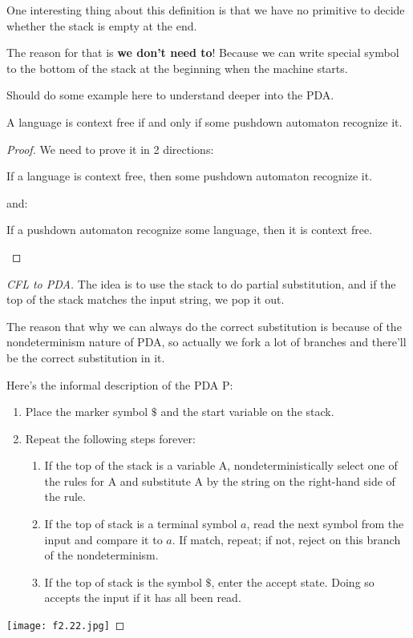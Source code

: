 One interesting thing about this definition is that we have no primitive to decide whether the stack is empty at the end.

The reason for that is \textbf{we don't need to}! Because we can write special symbol to the bottom of the stack at the beginning when the machine starts.

\begin{remark}
    Should do some example here to understand deeper into the PDA.   
\end{remark}

\begin{theorem}
    A language is context free if and only if some pushdown automaton recognize it.
\end{theorem}
\begin{proof}
    We need to prove it in 2 directions:
    \begin{lemma}\label{lemma: 4-1}
        If a language is context free, then some pushdown automaton recognize it.
    \end{lemma}
    and:
    \begin{lemma}\label{lemma: 4-2}
        If a pushdown automaton recognize some language, then it is context free.
    \end{lemma}
\end{proof}
\begin{proof}[CFL to PDA]
    The idea is to use the stack to do partial substitution, and if the top of the stack matches the input string, we pop it out.
    
    The reason that why we can always do the correct substitution is because of the nondeterminism nature of PDA, so actually we fork a lot of branches and there'll be the correct substitution in it.

    Here's the informal description of the PDA P:
    \begin{enumerate}
        \item Place the marker symbol \(\$\) and the start variable on the stack.
        \item Repeat the following steps forever:
        \begin{enumerate}
            \item If the top of the stack is a variable A, nondeterministically select one of the rules for A and substitute A by the string on the right-hand side of the rule.
            \item If the top of stack is a terminal symbol \(a\), read the next symbol from the input and compare it to \(a\). If match, repeat; if not, reject on this branch of the nondeterminism.
            \item If the top of stack is the symbol \(\$\), enter the accept state. Doing so accepts the input if it has all been read. 
        \end{enumerate}
    \end{enumerate}

    \texttt{[image: f2.22.jpg]}

\end{proof}
